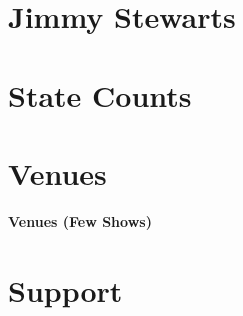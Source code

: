 \documentclass[8pt]{book}
\makeatletter
\let\mcnewpage=\newpage
\newcommand{\TrickSupertabularIntoMulticols}{
  \renewcommand\newpage{
    \if@firstcolumn
      \hrule width\linewidth height0pt
      \columnbreak
    \else
      \mcnewpage
    \fi
  }
}
\makeatother
\begin{document}
\chapter{Jimmy Stewarts}




\chapter{State Counts}




\chapter{Venues}

\begin{multicols*}{3}
\TrickSupertabularIntoMulticols
\noindent

\end{multicols*}
\newpage
\begin{Large}\noindent\textbf{Venues (Few Shows)}\end{Large}


\chapter{Support}

\begin{multicols*}{3}
\TrickSupertabularIntoMulticols
\noindent

\end{multicols*}
\end{document}
